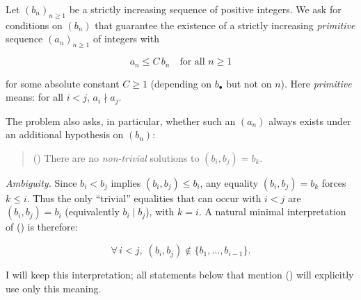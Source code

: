 Let $(b_n)_{n\ge 1}$ be a strictly increasing sequence of positive integers.
We ask for conditions on $(b_n)$ that guarantee the existence of a strictly
increasing \emph{primitive} sequence $(a_n)_{n\ge 1}$ of integers with

\[ a_n \le C\, b_n \quad \text{for all } n\ge 1 \]

for some absolute constant $C\ge 1$ (depending on $b_\bullet$ but not on $n$).
Here \emph{primitive} means: for all $i<j$, $a_i\nmid a_j$.

The problem also asks, in particular, whether such an $(a_n)$ always exists under
an additional hypothesis on $(b_n)$:

\begin{quote}
(\*) There are no \emph{non-trivial} solutions to $(b_i,b_j)=b_k$.
\end{quote}

\emph{Ambiguity.} Since $b_i<b_j$ implies $(b_i,b_j)\le b_i$, any equality
$(b_i,b_j)=b_k$ forces $k\le i$. Thus the only “trivial” equalities that can
occur with $i<j$ are $(b_i,b_j)=b_i$ (equivalently $b_i\mid b_j$), with $k=i$.
A natural minimal interpretation of (\*) is therefore:

\[ \forall\, i<j,\; (b_i,b_j)\notin\{b_1,\dots,b_{i-1}\}. \]

I will keep this interpretation; all statements below that mention (\*) will
explicitly use only this meaning.
